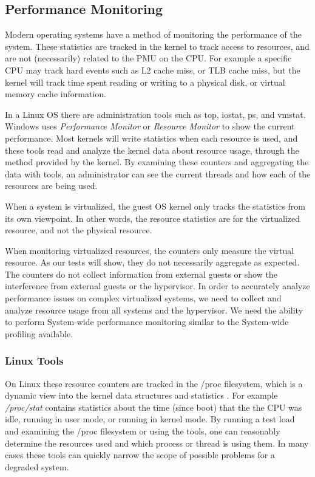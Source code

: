 \subsection{Performance Monitoring}
Modern operating systems have a method of monitoring the performance of the system.  These statistics are tracked in the kernel to track access to resources, and are not (necessarily) related to the PMU on the CPU.  For example a specific CPU may track hard events such as L2 cache miss, or TLB cache miss, but the kernel will track time spent reading or writing to a physical disk, or virtual memory cache information.

\indent In a Linux OS there are administration tools such as top, iostat, ps, and vmstat.  
Windows uses \emph{Performance Monitor} or \emph{Resource Monitor} to show the current performance.  
Most kernels will write statistics when each resource is used, and these tools read and analyze the kernel data about resource usage, through the method provided by the kernel.
By examining these counters and aggregating the data with tools, an administrator can see the current threads and how each of the resources are being used. 

\indent When a system is virtualized, the guest OS kernel only tracks the statistics from its own viewpoint.  
In other words, the resource statistics are for the virtualized resource, and not the physical resource.

\indent When monitoring virtualized resources, the counters only measure the virtual resource.  
As our tests will show, they do not necessarily aggregate as expected.  
The counters do not collect information from external guests or show the interference from external guests or the hypervisor.  
In order to accurately analyze performance issues on complex virtualized systems, we need to collect and analyze resource usage from all systems and the hypervisor.  
We need the ability to perform System-wide performance monitoring similar to the System-wide profiling available.

\subsubsection{Linux Tools}
\indent On Linux these resource counters are tracked in the /proc filesystem, which is a dynamic view into the kernel data structures and statistics \cite{proc}.  
For example \emph{/proc/stat} contains statistics about the time (since boot) that the the CPU was idle, running in user mode, or running in kernel mode.
By running a test load and examining the /proc filesystem or using the tools, one can reasonably determine the resources used and which process or thread is using them.  
In many cases these tools can quickly narrow the scope of possible problems for a degraded system. 

